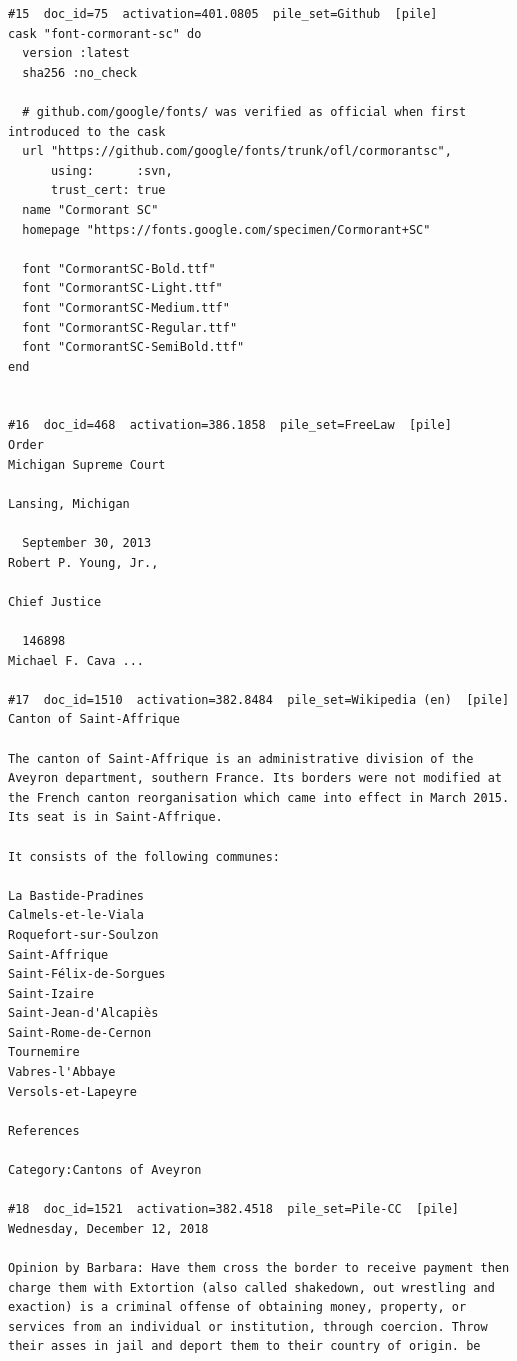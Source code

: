 \begin{verbatim}
#15  doc_id=75  activation=401.0805  pile_set=Github  [pile]
cask "font-cormorant-sc" do
  version :latest
  sha256 :no_check

  # github.com/google/fonts/ was verified as official when first introduced to the cask
  url "https://github.com/google/fonts/trunk/ofl/cormorantsc",
      using:      :svn,
      trust_cert: true
  name "Cormorant SC"
  homepage "https://fonts.google.com/specimen/Cormorant+SC"

  font "CormorantSC-Bold.ttf"
  font "CormorantSC-Light.ttf"
  font "CormorantSC-Medium.ttf"
  font "CormorantSC-Regular.ttf"
  font "CormorantSC-SemiBold.ttf"
end


#16  doc_id=468  activation=386.1858  pile_set=FreeLaw  [pile]
Order                                                                                       Michigan Supreme Court
                                                                                                  Lansing, Michigan

  September 30, 2013                                                                                  Robert P. Young, Jr.,
                                                                                                                Chief Justice

  146898                                                                                              Michael F. Cava ...

#17  doc_id=1510  activation=382.8484  pile_set=Wikipedia (en)  [pile]
Canton of Saint-Affrique

The canton of Saint-Affrique is an administrative division of the Aveyron department, southern France. Its borders were not modified at the French canton reorganisation which came into effect in March 2015. Its seat is in Saint-Affrique.

It consists of the following communes:
 
La Bastide-Pradines
Calmels-et-le-Viala
Roquefort-sur-Soulzon
Saint-Affrique
Saint-Félix-de-Sorgues
Saint-Izaire
Saint-Jean-d'Alcapiès
Saint-Rome-de-Cernon
Tournemire
Vabres-l'Abbaye
Versols-et-Lapeyre

References

Category:Cantons of Aveyron

#18  doc_id=1521  activation=382.4518  pile_set=Pile-CC  [pile]
Wednesday, December 12, 2018

Opinion by Barbara: Have them cross the border to receive payment then charge them with Extortion (also called shakedown, out wrestling and exaction) is a criminal offense of obtaining money, property, or services from an individual or institution, through coercion. Throw their asses in jail and deport them to their country of origin. be


\end{verbatim}
